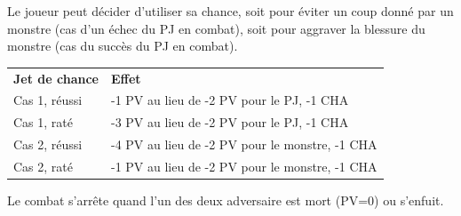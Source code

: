 \begin{frame}[b]
{Le joueur peut décider d'utiliser sa chance, soit pour éviter un coup donné par un monstre (cas d'un échec du PJ en combat), soit pour aggraver la blessure du monstre (cas du succès du PJ en combat).

\begin{center}
\begin{tabular}{ll}
\textbf{Jet de chance} & \textbf{Effet}                                        \\
    Cas 1, réussi          & -1 PV au lieu de -2 PV pour le PJ, -1 CHA      \\
    Cas 1, raté            & -3 PV au lieu de -2 PV pour le PJ, -1 CHA      \\
    Cas 2, réussi          & -4 PV au lieu de -2 PV pour le monstre, -1 CHA \\
    Cas 2, raté            & -1 PV au lieu de -2 PV pour le monstre, -1 CHA \\
\end{tabular}
\end{center}

Le combat s'arrête quand l'un des deux adversaire est mort (PV=0) ou s'enfuit.

}
\end{frame}

